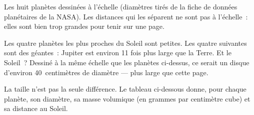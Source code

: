 \begin{omfigure}
\gsixsizes
{}

{\small Les huit planètes dessinées à l'échelle (diamètres tirés de la fiche
de données planétaires de la NASA). Les distances qui les séparent ne sont
pas à l'échelle~: elles sont bien trop grandes pour tenir sur une page.}
\end{omfigure}

Les quatre planètes les plus proches du Soleil sont petites. Les quatre
suivantes sont des géantes~: Jupiter est environ 11 fois plus large que la
Terre. Et le Soleil~? Dessiné à la même échelle que les planètes ci-dessus,
ce serait un disque d'environ 40~centimètres de diamètre --- plus large
que cette page.

La taille n'est pas la seule différence. Le tableau ci-dessous donne, pour
chaque planète, son diamètre, sa masse volumique (en grammes par centimètre
cube) et sa distance au Soleil.

